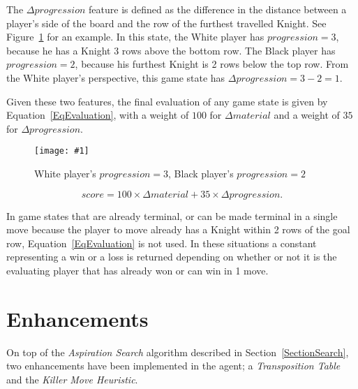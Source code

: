 \documentclass{article}
\newcommand{\insertfigure}[3]{ 
	\begin{figure}[#3]
	\begin{center}
	\texttt{[image: \#1]}
	\caption{#2}
	\label{#1}
	\end{center}
	\end{figure}
}
\newcommand{\refequation}[1]{Equation~\ref{#1}}
\newcommand{\reffigure}[1]{Figure~\ref{#1}}
\newcommand{\refsection}[1]{Section~\ref{#1}}
\begin{document}
The $\Delta progression$ feature is defined as the difference in the distance between a player's side of the board and the row of the furthest travelled Knight. See \reffigure{ExampleProgressionEval} for an example. In this state, the White player has $progression = 3$, because he has a Knight 3 rows above the bottom row. The Black player has $progression = 2$, because his furthest Knight is 2 rows below the top row. From the White player's perspective, this game state has $\Delta progression = 3 - 2 = 1$.

Given these two features, the final evaluation of any game state is given by \refequation{EqEvaluation}, with a weight of $100$ for $\Delta material$ and a weight of $35$ for $\Delta progression$.

\insertfigure{ExampleProgressionEval}{White player's $progression = 3$, Black player's $progression = 2$}{t}
\begin{equation} \label{EqEvaluation}
score = 100 \times \Delta material + 35 \times \Delta progression.
\end{equation}

In game states that are already terminal, or can be made terminal in a single move because the player to move already has a Knight within 2 rows of the goal row, \refequation{EqEvaluation} is not used. In these situations a constant representing a win or a loss is returned depending on whether or not it is the evaluating player that has already won or can win in 1 move.

\section{Enhancements} \label{SectionEnhancements}
On top of the \emph{Aspiration Search} algorithm described in \refsection{SectionSearch}, two enhancements have been implemented in the agent; a \emph{Transposition Table} and the \emph{Killer Move Heuristic}.
\end{document}
